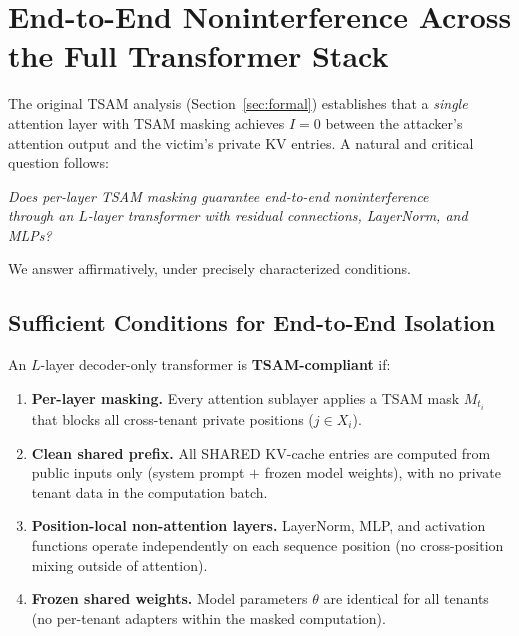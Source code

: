 
\section{End-to-End Noninterference Across the Full Transformer Stack}
\label{sec:e2e}

The original TSAM analysis (Section~\ref{sec:formal}) establishes that a \emph{single}
attention layer with TSAM masking achieves $I = 0$ between the attacker's attention
output and the victim's private KV entries.  A natural and critical question follows:

\begin{center}
\emph{Does per-layer TSAM masking guarantee end-to-end noninterference\\
through an $L$-layer transformer with residual connections, LayerNorm, and MLPs?}
\end{center}

We answer affirmatively, under precisely characterized conditions.

\subsection{Sufficient Conditions for End-to-End Isolation}
\label{sec:e2e:conditions}

\begin{definition}
\label{def:compliant}
An $L$-layer decoder-only transformer is \textbf{TSAM-compliant} if:
\begin{enumerate}[label=\textbf{C\arabic*}.,leftmargin=2em]
    \item \textbf{Per-layer masking.}  Every attention sublayer applies a TSAM mask
          $M_{t_i}$ that blocks all cross-tenant private positions ($j \in X_i$).
    \item \textbf{Clean shared prefix.}  All SHARED KV-cache entries are computed
          from public inputs only (system prompt $+$ frozen model weights), with
          no private tenant data in the computation batch.
    \item \textbf{Position-local non-attention layers.}  LayerNorm, MLP, and activation
          functions operate independently on each sequence position (no cross-position
          mixing outside of attention).
    \item \textbf{Frozen shared weights.}  Model parameters $\theta$ are identical
          for all tenants (no per-tenant adapters within the masked computation).
\end{enumerate}
\end{definition}

